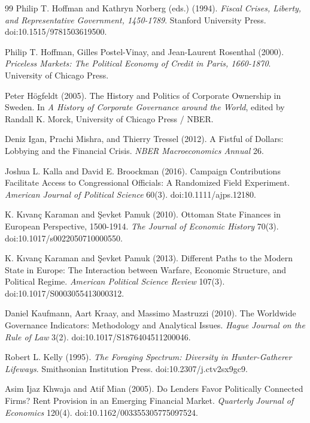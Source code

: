 \documentclass[11pt,letterpaper]{article}
\theoremstyle{definition}
\theoremstyle{remark}
\begin{document}
\begin{thebibliography}{99}
Philip T. Hoffman and Kathryn Norberg (eds.) (1994). \emph{Fiscal Crises, Liberty, and Representative Government, 1450-1789}. Stanford University Press. doi:10.1515/9781503619500.

Philip T. Hoffman, Gilles Postel-Vinay, and Jean-Laurent Rosenthal (2000). \emph{Priceless Markets: The Political Economy of Credit in Paris, 1660-1870}. University of Chicago Press.

Peter H\"ogfeldt (2005). The History and Politics of Corporate Ownership in Sweden. In \emph{A History of Corporate Governance around the World}, edited by Randall K. Morck, University of Chicago Press / NBER.

Deniz Igan, Prachi Mishra, and Thierry Tressel (2012). A Fistful of Dollars: Lobbying and the Financial Crisis. \emph{NBER Macroeconomics Annual} 26.

Joshua L. Kalla and David E. Broockman (2016). Campaign Contributions Facilitate Access to Congressional Officials: A Randomized Field Experiment. \emph{American Journal of Political Science} 60(3). doi:10.1111/ajps.12180.

K. K{\i}van\c{c} Karaman and \c{S}evket Pamuk (2010). Ottoman State Finances in European Perspective, 1500-1914. \emph{The Journal of Economic History} 70(3). doi:10.1017/s0022050710000550.

K. K{\i}van\c{c} Karaman and \c{S}evket Pamuk (2013). Different Paths to the Modern State in Europe: The Interaction between Warfare, Economic Structure, and Political Regime. \emph{American Political Science Review} 107(3). doi:10.1017/S0003055413000312.

Daniel Kaufmann, Aart Kraay, and Massimo Mastruzzi (2010). The Worldwide Governance Indicators: Methodology and Analytical Issues. \emph{Hague Journal on the Rule of Law} 3(2). doi:10.1017/S1876404511200046.

Robert L. Kelly (1995). \emph{The Foraging Spectrum: Diversity in Hunter-Gatherer Lifeways}. Smithsonian Institution Press. doi:10.2307/j.ctv2sx9gc9.

Asim Ijaz Khwaja and Atif Mian (2005). Do Lenders Favor Politically Connected Firms? Rent Provision in an Emerging Financial Market. \emph{Quarterly Journal of Economics} 120(4). doi:10.1162/003355305775097524.


\end{thebibliography}
\end{document}
